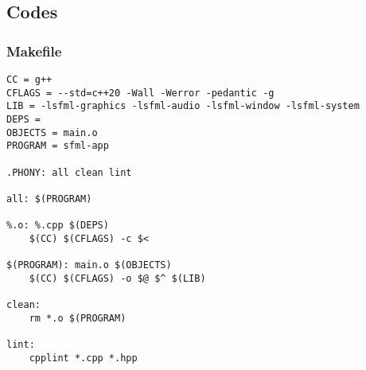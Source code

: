 \documentclass[12pt]{article}
\begin{document}
\subsection{Codes}

\subsubsection{Makefile}

\begin{lstlisting}[style=cppcode]
CC = g++
CFLAGS = --std=c++20 -Wall -Werror -pedantic -g
LIB = -lsfml-graphics -lsfml-audio -lsfml-window -lsfml-system
DEPS = 
OBJECTS = main.o
PROGRAM = sfml-app

.PHONY: all clean lint

all: $(PROGRAM)

%.o: %.cpp $(DEPS)
    $(CC) $(CFLAGS) -c $<

$(PROGRAM): main.o $(OBJECTS)
    $(CC) $(CFLAGS) -o $@ $^ $(LIB)

clean:
    rm *.o $(PROGRAM)

lint:
    cpplint *.cpp *.hpp
\end{lstlisting}
\end{document}
